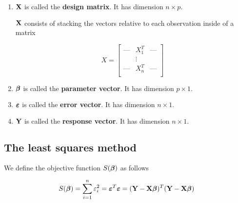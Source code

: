 \begin{definition}
    \begin{enumerate}[label=(\alph*)]
        \item $\mathbf{X}$ is called the \textbf{design matrix}. It has dimension $n \times p$.

              $\mathbf{X}$ consists of stacking the vectors relative to each observation inside of a matrix

              \[
                  X =
                  \begin{bmatrix}
                      \text{---} & X_1^T  & \text{---} \\
                                 & \vdots &            \\
                      \text{---} & X_n^T  & \text{---} \\
                  \end{bmatrix}
              \]
        \item $\boldsymbol{\beta}$ is called the \textbf{parameter vector}. It has dimension $p \times 1$.
        \item $\boldsymbol{\varepsilon}$ is called the \textbf{error vector}. It has dimension $n \times 1$.
        \item $\mathbf{Y}$ is called the \textbf{response vector}. It has dimension $n \times 1$.
    \end{enumerate}
\end{definition}





\subsection{The least squares method}

We define the objective function \( S(\boldsymbol{\beta}) \) as follows

\begin{equation}
    \label{eqn: least squares objective function}
    S(\boldsymbol{\beta}) = \sum_{i=1}^{n} \varepsilon_{i}^{2} = \boldsymbol{\varepsilon}^{T} \boldsymbol{\varepsilon} = (\mathbf{Y}-\mathbf{X} \boldsymbol{\beta})^{T}(\mathbf{Y}-\mathbf{X} \boldsymbol{\beta})
\end{equation}


